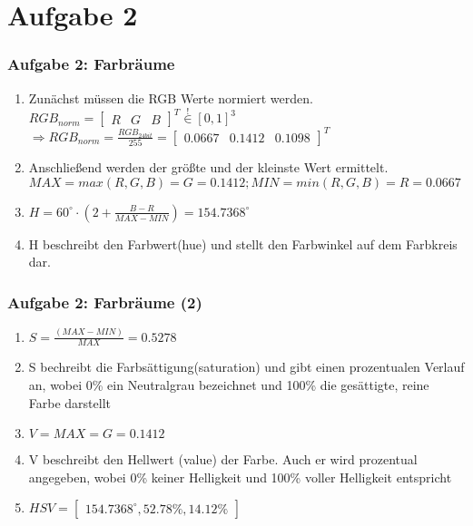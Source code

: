 \documentclass[accentcolor=tud9c,colorbacktitle,inverttitle,landscape,german,presentation,t]{tudbeamer}
\begin{document}
\section{Aufgabe 2}
	\begin{frame}
		\frametitle{Aufgabe 2: Farbräume}
			\begin{enumerate}
			\item Zunächst müssen die RGB Werte normiert werden. $ RGB_{norm} =
			\begin{bmatrix}
				R&G&B
			\end{bmatrix}^T \stackrel{!}{\in} [0,1]^3$
			$\Rightarrow RGB_{norm} = \frac{RGB_{24bit}}{255} = \begin{bmatrix}
			0.0667&0.1412&0.1098
			\end{bmatrix}^T$
			\item Anschließend werden der größte und der kleinste Wert ermittelt. $MAX = max(R, G, B) = G = 0.1412; MIN = min(R, G, B) = R = 0.0667$
			\item  $H = 60 ^{\circ} \cdot (2 + \frac{B-R}{MAX-MIN}) = 154.7368^{\circ}$
			\item  H beschreibt den Farbwert(hue) und stellt den Farbwinkel auf dem Farbkreis dar.
			\end{enumerate}
		\end{frame}
		\begin{frame}
			\frametitle{Aufgabe 2: Farbräume (2)}
			\begin{enumerate}
				\item $S = \frac{(MAX-MIN)}{MAX} = 0.5278$
				\item S bechreibt die Farbsättigung(saturation) und gibt einen prozentualen Verlauf an, wobei 0\% ein Neutralgrau bezeichnet und 100\% die gesättigte, reine Farbe darstellt \
				\item $V = MAX = G = 0.1412$
				\item V beschreibt den Hellwert (value) der Farbe. Auch er wird prozentual angegeben, wobei 0\% keiner Helligkeit und 100\% voller Helligkeit entspricht
				\item $HSV = \begin{bmatrix}154.7368^{\circ}, 52.78\%, 14.12\%\end{bmatrix}$
			\end{enumerate}
		\end{frame}
\end{document}
